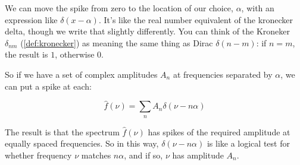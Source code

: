 We can move the spike from zero to the location of our choice, $\alpha$, with an expression like $\delta(x - \alpha)$. It's like the real number equivalent of the kronecker delta, though we write that slightly differently. You can think of the Kroneker $\delta_{nm}$ (\ref{def:kronecker}) as meaning the same thing as Dirac $\delta(n - m)$: if $n = m$, the result is $1$, otherwise $0$.

So if we have a set of complex amplitudes $A_n$ at frequencies separated by $\alpha$, we can put a spike at each:

$$
\hat{f}(\nu) =
\sum_n A_n \delta(\nu - n\alpha)
$$

The result is that the spectrum $\hat{f}(\nu)$ has spikes of the required amplitude at equally spaced frequencies. So in this way, $\delta(\nu - n\alpha)$ is like a logical test for whether frequency $\nu$ matches $n\alpha$, and if so, $\nu$ has amplitude $A_n$.
